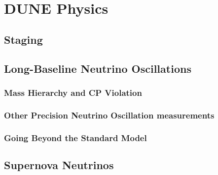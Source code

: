\chapter{DUNE Physics}
\label{ch:exec-summ-physics}


\section{Staging}
\label{sec:exec-summ-physics-staging}


\section{Long-Baseline Neutrino Oscillations}
\label{sec:exec-summ-physics-osc}


\subsection{Mass Hierarchy and CP Violation}
\label{sec:exec-summ-physics-mh-cpv}


\subsection{Other Precision Neutrino Oscillation measurements}
\label{sec:exec-summ-physics-other}


\subsection{Going Beyond the Standard Model}
\label{sec:exec-summ-physics-bsm}




\section{Supernova Neutrinos}
\label{sec:exec-summ-physics-sn}

